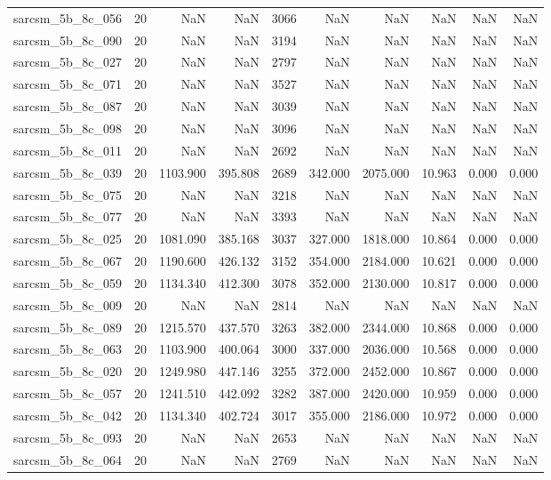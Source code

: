 \begin{tabular}{lrrrrrrrrr}
sarcsm\_5b\_8c\_056 & 20 & NaN & NaN & 3066 & NaN & NaN & NaN & NaN & NaN \\
sarcsm\_5b\_8c\_090 & 20 & NaN & NaN & 3194 & NaN & NaN & NaN & NaN & NaN \\
sarcsm\_5b\_8c\_027 & 20 & NaN & NaN & 2797 & NaN & NaN & NaN & NaN & NaN \\
sarcsm\_5b\_8c\_071 & 20 & NaN & NaN & 3527 & NaN & NaN & NaN & NaN & NaN \\
sarcsm\_5b\_8c\_087 & 20 & NaN & NaN & 3039 & NaN & NaN & NaN & NaN & NaN \\
sarcsm\_5b\_8c\_098 & 20 & NaN & NaN & 3096 & NaN & NaN & NaN & NaN & NaN \\
sarcsm\_5b\_8c\_011 & 20 & NaN & NaN & 2692 & NaN & NaN & NaN & NaN & NaN \\
sarcsm\_5b\_8c\_039 & 20 & 1103.900 & 395.808 & 2689 & 342.000 & 2075.000 & 10.963 & 0.000 & 0.000 \\
sarcsm\_5b\_8c\_075 & 20 & NaN & NaN & 3218 & NaN & NaN & NaN & NaN & NaN \\
sarcsm\_5b\_8c\_077 & 20 & NaN & NaN & 3393 & NaN & NaN & NaN & NaN & NaN \\
sarcsm\_5b\_8c\_025 & 20 & 1081.090 & 385.168 & 3037 & 327.000 & 1818.000 & 10.864 & 0.000 & 0.000 \\
sarcsm\_5b\_8c\_067 & 20 & 1190.600 & 426.132 & 3152 & 354.000 & 2184.000 & 10.621 & 0.000 & 0.000 \\
sarcsm\_5b\_8c\_059 & 20 & 1134.340 & 412.300 & 3078 & 352.000 & 2130.000 & 10.817 & 0.000 & 0.000 \\
sarcsm\_5b\_8c\_009 & 20 & NaN & NaN & 2814 & NaN & NaN & NaN & NaN & NaN \\
sarcsm\_5b\_8c\_089 & 20 & 1215.570 & 437.570 & 3263 & 382.000 & 2344.000 & 10.868 & 0.000 & 0.000 \\
sarcsm\_5b\_8c\_063 & 20 & 1103.900 & 400.064 & 3000 & 337.000 & 2036.000 & 10.568 & 0.000 & 0.000 \\
sarcsm\_5b\_8c\_020 & 20 & 1249.980 & 447.146 & 3255 & 372.000 & 2452.000 & 10.867 & 0.000 & 0.000 \\
sarcsm\_5b\_8c\_057 & 20 & 1241.510 & 442.092 & 3282 & 387.000 & 2420.000 & 10.959 & 0.000 & 0.000 \\
sarcsm\_5b\_8c\_042 & 20 & 1134.340 & 402.724 & 3017 & 355.000 & 2186.000 & 10.972 & 0.000 & 0.000 \\
sarcsm\_5b\_8c\_093 & 20 & NaN & NaN & 2653 & NaN & NaN & NaN & NaN & NaN \\
sarcsm\_5b\_8c\_064 & 20 & NaN & NaN & 2769 & NaN & NaN & NaN & NaN & NaN \\

\end{tabular}
